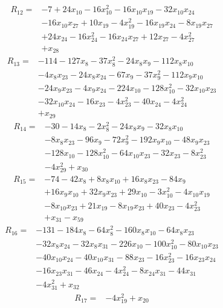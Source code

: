 \begin{align*} R_{12}={}&-7 +24 x_{10} -16 x_{10}^{2} -16 x_{10}x_{19} -32 x_{10}x_{24}
\\ &-16 x_{10}x_{27} +10 x_{19} -4 x_{19}^{2} -16 x_{19}x_{24} -8 x_{19}x_{27}
\\ &+24 x_{24} -16 x_{24}^{2} -16 x_{24}x_{27} +12 x_{27} -4 x_{27}^{2}
\\ &+x_{28}
\end{align*}
\begin{align*} R_{13}={}&-114 -127 x_{8} -37 x_{8}^{2} -24 x_{8}x_{9} -112 x_{8}x_{10}
\\ &-4 x_{8}x_{23} -24 x_{8}x_{24} -67 x_{9} -37 x_{9}^{2} -112 x_{9}x_{10}
\\ &-24 x_{9}x_{23} -4 x_{9}x_{24} -224 x_{10} -128 x_{10}^{2} -32 x_{10}x_{23}
\\ &-32 x_{10}x_{24} -16 x_{23} -4 x_{23}^{2} -40 x_{24} -4 x_{24}^{2}
\\ &+x_{29}
\end{align*}
\begin{align*} R_{14}={}&-30 -14 x_{8} -2 x_{8}^{2} -24 x_{8}x_{9} -32 x_{8}x_{10}
\\ &-8 x_{8}x_{23} -96 x_{9} -72 x_{9}^{2} -192 x_{9}x_{10} -48 x_{9}x_{23}
\\ &-128 x_{10} -128 x_{10}^{2} -64 x_{10}x_{23} -32 x_{23} -8 x_{23}^{2}
\\ &-4 x_{29}^{2} +x_{30}
\end{align*}
\begin{align*} R_{15}={}&-74 -42 x_{8} +8 x_{8}x_{10} +16 x_{8}x_{23} -84 x_{9}
\\ &+16 x_{9}x_{10} +32 x_{9}x_{23} +29 x_{10} -3 x_{10}^{2} -4 x_{10}x_{19}
\\ &-8 x_{10}x_{23} +21 x_{19} -8 x_{19}x_{23} +40 x_{23} -4 x_{23}^{2}
\\ &+x_{31} -x_{59}
\end{align*}
\begin{align*} R_{16}={}&-131 -184 x_{8} -64 x_{8}^{2} -160 x_{8}x_{10} -64 x_{8}x_{23}
\\ &-32 x_{8}x_{24} -32 x_{8}x_{31} -226 x_{10} -100 x_{10}^{2} -80 x_{10}x_{23}
\\ &-40 x_{10}x_{24} -40 x_{10}x_{31} -88 x_{23} -16 x_{23}^{2} -16 x_{23}x_{24}
\\ &-16 x_{23}x_{31} -46 x_{24} -4 x_{24}^{2} -8 x_{24}x_{31} -44 x_{31}
\\ &-4 x_{31}^{2} +x_{32}
\end{align*}
\begin{align*} R_{17}={}&-4 x_{19}^{2} +x_{20}
\end{align*}
